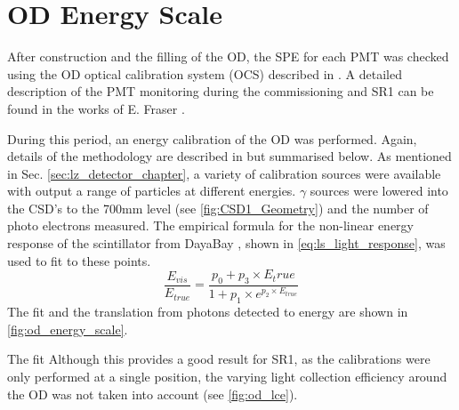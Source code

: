 \section{OD Energy Scale} \label{sec:od_energy_scale}
\par
After construction and the filling of the OD, the SPE for each PMT was checked using the OD optical calibration system (OCS) described in \cite{lz_ocs_system_ref}.
A detailed description of the PMT monitoring during the commissioning and SR1 can be found in the works of E. Fraser \cite{ewanfraser_thesis_ref}. 
\par
During this period, an energy calibration of the OD was performed.
Again, details of the methodology are described in \cite{ewanfraser_thesis_ref} but summarised below.
As mentioned in Sec. \ref{sec:lz_detector_chapter}, a variety of calibration sources were available with output a range of particles at different energies.
$\gamma$ sources were lowered into the CSD's to the 700mm level (see \autoref{fig:CSD1_Geometry}) and the number of photo electrons measured.
The empirical formula for the non-linear energy response of the scintillator from DayaBay \cite{dayabay_antineutrino_oscillation_ref, ls_nonlinear_energy_response_ref}, shown in \autoref{eq:ls_light_response}, was used to fit to these points.
\begin{equation}
    \frac{E_{vis}}{E_{true}} = \frac{p_0  + p_3 \times E_true}{1 + p_1 \times e^{p_2 \times E_{true}}}
    \label{eq:ls_light_response}
\end{equation}
The fit and the translation from photons detected to energy are shown in \autoref{fig:od_energy_scale}.



\par
The fit 
Although this provides a good result for SR1, as the calibrations were only performed at a single position, the varying light collection efficiency around the OD was not taken into account (see \autoref{fig:od_lce}).

